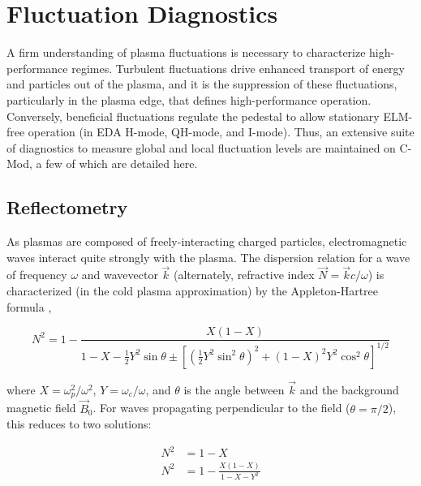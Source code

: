 \nicesectionending

\section{Fluctuation Diagnostics}\label{sec:app_fluct}

A firm understanding of plasma fluctuations is necessary to characterize high-performance regimes.  Turbulent fluctuations drive enhanced transport of energy and particles out of the plasma, and it is the suppression of these fluctuations, particularly in the plasma edge, that defines high-performance operation.  Conversely, beneficial fluctuations regulate the pedestal to allow stationary ELM-free operation (\eg in EDA H-mode, QH-mode, and I-mode).  Thus, an extensive suite of diagnostics to measure global and local fluctuation levels are maintained on C-Mod, a few of which are detailed here.

\subsection{Reflectometry}\label{subsec:app_reflect}

As plasmas are composed of freely-interacting charged particles, electromagnetic waves interact quite strongly with the plasma.  The dispersion relation for a wave of frequency $\omega$ and wavevector $\vec{k}$ (alternately, refractive index $\vec{N} = \vec{k}c/\omega$) is characterized (in the cold plasma approximation) by the Appleton-Hartree formula \cite[\S 4]{Hutchinson},

\begin{equation}\label{eq:appletonhartree}
  N^2 = 1 - \frac{X(1-X)}{1 - X - \frac{1}{2} Y^2 \sin \theta \pm \left[ \left( \frac{1}{2} Y^2 \sin^2 \theta \right)^2 + \left(1 - X\right)^2 Y^2 \cos^2 \theta \right]^{1/2}}
\end{equation}

\noindent where $X = \omega_p^2/\omega^2$, $Y = \omega_c/\omega$, and $\theta$ is the angle between $\vec{k}$ and the background magnetic field $\vec{B}_0$.  For waves propagating perpendicular to the field ($\theta = \pi/2$), this reduces to two solutions:

\begin{equation}\label{eq:perpwave}
 \begin{aligned}
  N^2 &= 1-X\\
  N^2 &= 1 - \frac{X(1-X)}{1-X-Y^2}
 \end{aligned}
\end{equation}

